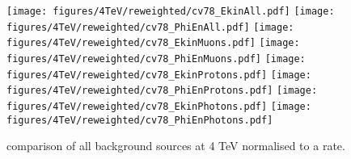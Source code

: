 

\begin{figure}
\begin{center}
  \texttt{[image: figures/4TeV/reweighted/cv78\_EkinAll.pdf]}
  \texttt{[image: figures/4TeV/reweighted/cv78\_PhiEnAll.pdf]}
  \texttt{[image: figures/4TeV/reweighted/cv78\_EkinMuons.pdf]}
  \texttt{[image: figures/4TeV/reweighted/cv78\_PhiEnMuons.pdf]}
  \texttt{[image: figures/4TeV/reweighted/cv78\_EkinProtons.pdf]}
  \texttt{[image: figures/4TeV/reweighted/cv78\_PhiEnProtons.pdf]}
  \texttt{[image: figures/4TeV/reweighted/cv78\_EkinPhotons.pdf]}
  \texttt{[image: figures/4TeV/reweighted/cv78\_PhiEnPhotons.pdf]}
\end{center}
\vspace{-0.6cm}
 \caption{comparison of all background sources at 4 TeV normalised to a rate.
  \label{compAllBKG4TeV_rates}}
\end{figure}

